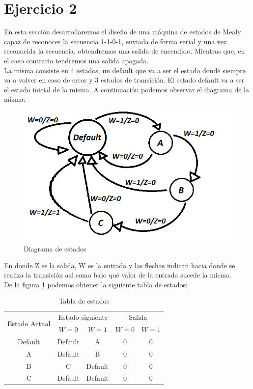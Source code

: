 \section{Ejercicio 2}
En esta sección desarrollaremos el diseño de una máquina de estados de Mealy capaz de reconocer la secuencia 1-1-0-1, enviada de forma serial y una vez reconocida la secuencia, obtendremos una salida de encendido. Mientras que, en el caso contrario tendremos una salida apagada.\\
La misma consiste en 4 estados, un default que va a ser el estado donde siempre va a volver en caso de error y 3 estados de transición. El estado default va a ser el estado inicial de la misma.
A continuación podemos observar el diagrama de la misma:
\begin{figure}[h!]
	\centering
	\includegraphics[scale=0.4]{Ejercicio2/Diagrama_de_estados.png}
	\caption{Diagrama de estados}
	\label{f:Mealy}
\end{figure}
En donde Z es la salida, W es la entrada y las flechas indican hacia donde se realiza la transición así como bajo qué valor de la entrada sucede la misma.\\
De la figura \ref{f:Mealy} podemos obtener la siguiente tabla de estados:\\
\begin{table}[h!]
	\begin{center}
		\caption{Tabla de estados}
		\begin{tabular}{|c|c c|c c|}
		\hline
		\multirow{2}{*}{Estado Actual} & \multicolumn{2}{|c|}{Estado siguiente} & \multicolumn{2}{|c|}{Salida}\\
		& $W=0$ & $W=1$ & $W=0$ & $W=1$\\
		\hline
		Default & Default & A & 0 & 0\\
		\hline
		A & Default & B & 0 & 0\\
		\hline
		B & C & Default & 0 & 0\\
		\hline
		C & Default & Default & 0 & 0\\
		\hline
		\end{tabular}
	\end{center}
\end{table}\\
